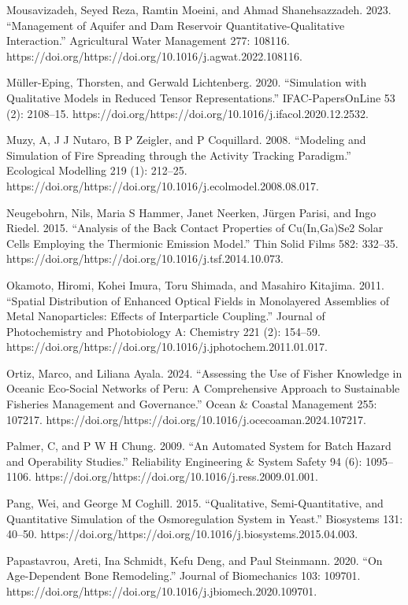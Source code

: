 \documentclass[utf8]{gradu3}
\begin{document}
Mousavizadeh, Seyed Reza, Ramtin Moeini, and Ahmad Shanehsazzadeh. 2023. “Management of Aquifer and Dam Reservoir Quantitative-Qualitative Interaction.” Agricultural Water Management 277: 108116. https://doi.org/https://doi.org/10.1016/j.agwat.2022.108116.

Müller-Eping, Thorsten, and Gerwald Lichtenberg. 2020. “Simulation with Qualitative Models in Reduced Tensor Representations.” IFAC-PapersOnLine 53 (2): 2108–15. https://doi.org/https://doi.org/10.1016/j.ifacol.2020.12.2532.

Muzy, A, J J Nutaro, B P Zeigler, and P Coquillard. 2008. “Modeling and Simulation of Fire Spreading through the Activity Tracking Paradigm.” Ecological Modelling 219 (1): 212–25. https://doi.org/https://doi.org/10.1016/j.ecolmodel.2008.08.017.

Neugebohrn, Nils, Maria S Hammer, Janet Neerken, Jürgen Parisi, and Ingo Riedel. 2015. “Analysis of the Back Contact Properties of Cu(In,Ga)Se2 Solar Cells Employing the Thermionic Emission Model.” Thin Solid Films 582: 332–35. https://doi.org/https://doi.org/10.1016/j.tsf.2014.10.073.

Okamoto, Hiromi, Kohei Imura, Toru Shimada, and Masahiro Kitajima. 2011. “Spatial Distribution of Enhanced Optical Fields in Monolayered Assemblies of Metal Nanoparticles: Effects of Interparticle Coupling.” Journal of Photochemistry and Photobiology A: Chemistry 221 (2): 154–59. https://doi.org/https://doi.org/10.1016/j.jphotochem.2011.01.017.

Ortiz, Marco, and Liliana Ayala. 2024. “Assessing the Use of Fisher Knowledge in Oceanic Eco-Social Networks of Peru: A Comprehensive Approach to Sustainable Fisheries Management and Governance.” Ocean \& Coastal Management 255: 107217. https://doi.org/https://doi.org/10.1016/j.ocecoaman.2024.107217.

Palmer, C, and P W H Chung. 2009. “An Automated System for Batch Hazard and Operability Studies.” Reliability Engineering \& System Safety 94 (6): 1095–1106. https://doi.org/https://doi.org/10.1016/j.ress.2009.01.001.

Pang, Wei, and George M Coghill. 2015. “Qualitative, Semi-Quantitative, and Quantitative Simulation of the Osmoregulation System in Yeast.” Biosystems 131: 40–50. https://doi.org/https://doi.org/10.1016/j.biosystems.2015.04.003.

Papastavrou, Areti, Ina Schmidt, Kefu Deng, and Paul Steinmann. 2020. “On Age-Dependent Bone Remodeling.” Journal of Biomechanics 103: 109701. https://doi.org/https://doi.org/10.1016/j.jbiomech.2020.109701.
\end{document}
